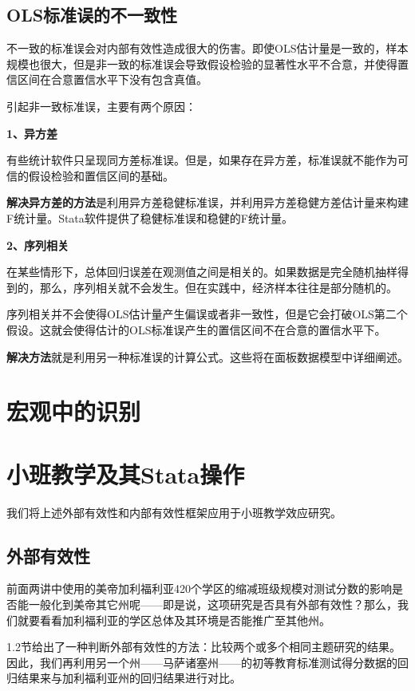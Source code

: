 \documentclass[cn,12pt,math=newtx,citestyle=gb7714-2015,bibstyle=gb7714-2015]{elegantbook}
\begin{document}
\subsection{OLS标准误的不一致性}
不一致的标准误会对内部有效性造成很大的伤害。即使OLS估计量是一致的，样本规模也很大，但是非一致的标准误会导致假设检验的显著性水平不合意，并使得置信区间在合意置信水平下没有包含真值。

引起非一致标准误，主要有两个原因：

\textbf{1、异方差}

有些统计软件只呈现同方差标准误。但是，如果存在异方差，标准误就不能作为可信的假设检验和置信区间的基础。

\textbf{解决异方差的方法}是利用异方差稳健标准误，并利用异方差稳健方差估计量来构建F统计量。Stata软件提供了稳健标准误和稳健的F统计量。

\textbf{2、序列相关}

在某些情形下，总体回归误差在观测值之间是相关的。如果数据是完全随机抽样得到的，那么，序列相关就不会发生。但在实践中，经济样本往往是部分随机的。

序列相关并不会使得OLS估计量产生偏误或者非一致性，但是它会打破OLS第二个假设。这就会使得估计的OLS标准误产生的置信区间不在合意的置信水平下。

\textbf{解决方法}就是利用另一种标准误的计算公式。这些将在面板数据模型中详细阐述。

\section{宏观中的识别}

\section{小班教学及其Stata操作}
我们将上述外部有效性和内部有效性框架应用于小班教学效应研究。

\subsection{外部有效性}
前面两讲中使用的美帝加利福利亚420个学区的缩减班级规模对测试分数的影响是否能一般化到美帝其它州呢——即是说，这项研究是否具有外部有效性？那么，我们就要看看加利福利亚的学区总体及其环境是否能推广至其他州。

1.2节给出了一种判断外部有效性的方法：比较两个或多个相同主题研究的结果。因此，我们再利用另一个州——马萨诸塞州——的初等教育标准测试得分数据的回归结果来与加利福利亚州的回归结果进行对比。
\end{document}
